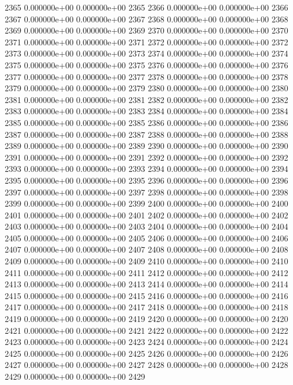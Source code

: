 \documentclass{article}
\begin{document}
\begin{Schunk}
\begin{Soutput}
2365   0.000000e+00   0.000000e+00 2365
2366   0.000000e+00   0.000000e+00 2366
2367   0.000000e+00   0.000000e+00 2367
2368   0.000000e+00   0.000000e+00 2368
2369   0.000000e+00   0.000000e+00 2369
2370   0.000000e+00   0.000000e+00 2370
2371   0.000000e+00   0.000000e+00 2371
2372   0.000000e+00   0.000000e+00 2372
2373   0.000000e+00   0.000000e+00 2373
2374   0.000000e+00   0.000000e+00 2374
2375   0.000000e+00   0.000000e+00 2375
2376   0.000000e+00   0.000000e+00 2376
2377   0.000000e+00   0.000000e+00 2377
2378   0.000000e+00   0.000000e+00 2378
2379   0.000000e+00   0.000000e+00 2379
2380   0.000000e+00   0.000000e+00 2380
2381   0.000000e+00   0.000000e+00 2381
2382   0.000000e+00   0.000000e+00 2382
2383   0.000000e+00   0.000000e+00 2383
2384   0.000000e+00   0.000000e+00 2384
2385   0.000000e+00   0.000000e+00 2385
2386   0.000000e+00   0.000000e+00 2386
2387   0.000000e+00   0.000000e+00 2387
2388   0.000000e+00   0.000000e+00 2388
2389   0.000000e+00   0.000000e+00 2389
2390   0.000000e+00   0.000000e+00 2390
2391   0.000000e+00   0.000000e+00 2391
2392   0.000000e+00   0.000000e+00 2392
2393   0.000000e+00   0.000000e+00 2393
2394   0.000000e+00   0.000000e+00 2394
2395   0.000000e+00   0.000000e+00 2395
2396   0.000000e+00   0.000000e+00 2396
2397   0.000000e+00   0.000000e+00 2397
2398   0.000000e+00   0.000000e+00 2398
2399   0.000000e+00   0.000000e+00 2399
2400   0.000000e+00   0.000000e+00 2400
2401   0.000000e+00   0.000000e+00 2401
2402   0.000000e+00   0.000000e+00 2402
2403   0.000000e+00   0.000000e+00 2403
2404   0.000000e+00   0.000000e+00 2404
2405   0.000000e+00   0.000000e+00 2405
2406   0.000000e+00   0.000000e+00 2406
2407   0.000000e+00   0.000000e+00 2407
2408   0.000000e+00   0.000000e+00 2408
2409   0.000000e+00   0.000000e+00 2409
2410   0.000000e+00   0.000000e+00 2410
2411   0.000000e+00   0.000000e+00 2411
2412   0.000000e+00   0.000000e+00 2412
2413   0.000000e+00   0.000000e+00 2413
2414   0.000000e+00   0.000000e+00 2414
2415   0.000000e+00   0.000000e+00 2415
2416   0.000000e+00   0.000000e+00 2416
2417   0.000000e+00   0.000000e+00 2417
2418   0.000000e+00   0.000000e+00 2418
2419   0.000000e+00   0.000000e+00 2419
2420   0.000000e+00   0.000000e+00 2420
2421   0.000000e+00   0.000000e+00 2421
2422   0.000000e+00   0.000000e+00 2422
2423   0.000000e+00   0.000000e+00 2423
2424   0.000000e+00   0.000000e+00 2424
2425   0.000000e+00   0.000000e+00 2425
2426   0.000000e+00   0.000000e+00 2426
2427   0.000000e+00   0.000000e+00 2427
2428   0.000000e+00   0.000000e+00 2428
2429   0.000000e+00   0.000000e+00 2429

\end{Soutput}
\end{Schunk}
\end{document}
